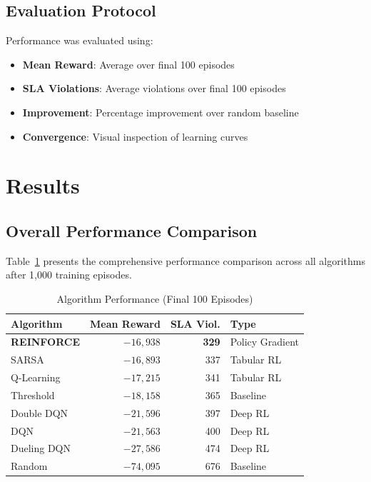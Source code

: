 \documentclass[conference]{IEEEtran}
\begin{document}
\subsection{Evaluation Protocol}
Performance was evaluated using:
\begin{itemize}
    \item \textbf{Mean Reward}: Average over final 100 episodes
    \item \textbf{SLA Violations}: Average violations over final 100 episodes
    \item \textbf{Improvement}: Percentage improvement over random baseline
    \item \textbf{Convergence}: Visual inspection of learning curves
\end{itemize}

\section{Results}

\subsection{Overall Performance Comparison}
Table~\ref{tab:main_results} presents the comprehensive performance comparison across all algorithms after 1,000 training episodes.

\begin{table}[htbp]
\centering
\caption{Algorithm Performance (Final 100 Episodes)}
\label{tab:main_results}
\begin{tabular}{lrrl}
\toprule
\textbf{Algorithm} & \textbf{Mean Reward} & \textbf{SLA Viol.} & \textbf{Type} \\
\midrule
\rowcolor{purple!10} \textbf{REINFORCE} & $-16,938$ & \textbf{329} & Policy Gradient \\
\rowcolor{green!10} SARSA & $-16,893$ & 337 & Tabular RL \\
\rowcolor{green!10} Q-Learning & $-17,215$ & 341 & Tabular RL \\
Threshold & $-18,158$ & 365 & Baseline \\
Double DQN & $-21,596$ & 397 & Deep RL \\
DQN & $-21,563$ & 400 & Deep RL \\
Dueling DQN & $-27,586$ & 474 & Deep RL \\
Random & $-74,095$ & 676 & Baseline \\
\bottomrule
\end{tabular}
\end{table}
\end{document}
